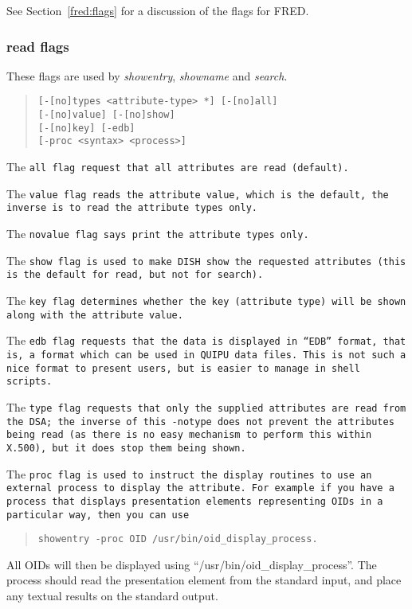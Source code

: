 See Section~\ref{fred:flags} for a discussion of the flags for FRED.

\subsubsection{read flags}

These flags are used by {\em showentry}, {\em showname} and {\em search}.

\begin{quote}\begin{verbatim}
[-[no]types <attribute-type> *] [-[no]all] 
[-[no]value] [-[no]show] 
[-[no]key] [-edb]
[-proc <syntax> <process>]
\end{verbatim}\end{quote}

The \tt all\rm \ flag request that all attributes are read (default).

The \tt value\rm \ flag reads the attribute value, which is the default, 
the inverse is to read the attribute types only.

The \tt novalue\rm \ flag says print the attribute types only.

The \tt show\rm \ flag is used to make DISH show the requested
attributes (this is the default for read, but not for search).

The \tt key\rm \ flag determines whether the key (attribute type) will 
be shown along with the attribute value.

The \tt edb\rm \ flag requests that the data is displayed in ``EDB'' format,
that is, a format which can be used in QUIPU data files.  This is not such 
a nice format to present users, but is easier to manage in shell scripts.

The \tt type\rm \ flag requests that only the supplied attributes are 
read from the DSA; the inverse of this \tt -notype\rm \ does not 
prevent the attributes being read (as there is no
easy mechanism to perform this within X.500), 
but it does stop them being shown.

The \tt proc\rm \ flag is used to instruct the display routines to use an
external process to display the attribute.
For example if you have a process that displays presentation elements
representing OIDs in a particular
way, then you can use
\begin{quote}\begin{verbatim}
showentry -proc OID /usr/bin/oid_display_process.
\end{verbatim}\end{quote}
All OIDs will then be displayed using ``/usr/bin/oid\_display\_process''.
The process should read the presentation element from the standard input, and
place any textual results on the standard output.


